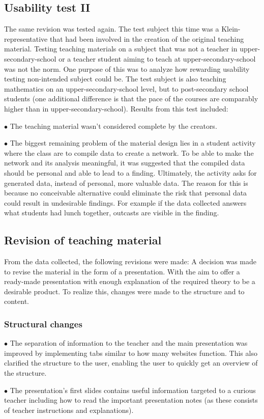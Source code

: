\subsection{Usability test II}
The same revision was tested again. The test subject this time was a Klein-representative that had been involved in the creation of the original teaching material. Testing teaching materials on a subject that was not a teacher in upper-secondary-school or a teacher student aiming to teach at upper-secondary-school was not the norm. One purpose of this was to analyze how rewarding usability testing non-intended subject could be. The test subject is also teaching mathematics on an upper-secondary-school level, but to post-secondary school students (one additional difference is that the pace of the courses are comparably higher than in upper-secondary-school). Results from this test included:
\begin{description}
    \item $\bullet$ The teaching material wasn't considered complete by the creators.
    \item $\bullet$ The biggest remaining problem of the material design lies in a student activity where the class are to compile data to create a network. To be able to make the network and its analysis meaningful, it was suggested that the compiled data should be personal and able to lead to a finding. Ultimately, the activity asks for generated data, instead of personal, more valuable data. The reason for this is because no conceivable alternative could eliminate the risk that personal data could result in undesirable findings. For example if the data collected answers what students had lunch together, outcasts are visible in the finding.
\end{description}
\subsection{Revision of teaching material}
From the data collected, the following revisions were made:
A decision was made to revise the material in the form of a presentation. With the aim to offer a ready-made presentation with enough explanation of the required theory to be a desirable product. To realize this, changes were made to the structure and to content.
\subsubsection*{Structural changes}
\begin{description}
    \item $\bullet$ The separation of information to the teacher and the main presentation was improved by implementing tabs similar to how many websites function. This also clarified the structure to the user, enabling the user to quickly get an overview of the structure.
    \item $\bullet$ The presentation's first slides contains useful information targeted to a curious teacher including how to read the important presentation notes (as these consists of teacher instructions and explanations).
\end{description}
